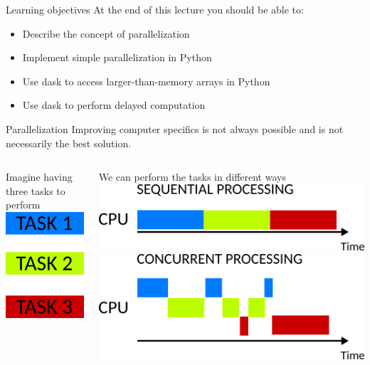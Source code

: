 \documentclass[9pt, aspectratio=169]{beamer}
\begin{document}
\begin{frame}
	{Learning objectives}
	At the end of this lecture you should be able to:
	\begin{itemize}
		\item Describe the concept of parallelization
		\item Implement simple parallelization in Python
		\item Use dask to access larger-than-memory arrays in Python
		\item Use dask to perform delayed computation
	\end{itemize}
\end{frame}

\begin{frame}
	{Parallelization}
	Improving computer specifics is not always possible and is not necessarily the best solution.\\
	\vspace{2em}
	\begin{columns}
		\begin{column}{.4\textwidth}
			Imagine having three tasks to perform\\
			\vspace{2em}
			\centering
			\includegraphics[width=.3\textwidth]{threetasks.png}
		\end{column}
		\pause
		\begin{column}{.6\textwidth}
			We can perform the tasks in different ways\\
			\vspace{2em}
			\includegraphics[width=.65\textwidth]{sequential.png}\\
			\pause
			\includegraphics[width=.65\textwidth]{concurrent.png}\\

\end{column}
\end{columns}
\end{frame}
\end{document}
